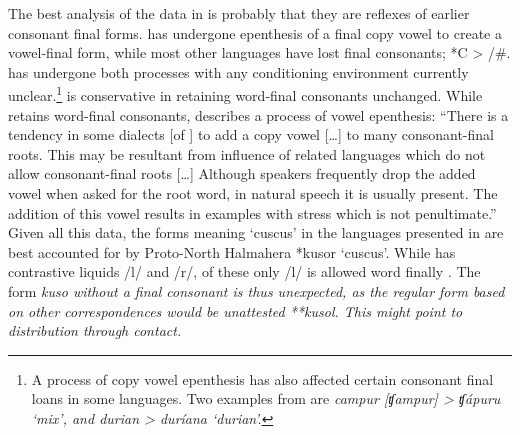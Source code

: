 The best analysis of the data 
in  is probably that they are
reflexes of earlier consonant final forms.
 has undergone epenthesis of a final copy vowel to create
a vowel-final form, while most other languages have lost final consonants; *C > {\0} /{\gap}{\#}.
 has undergone both processes with any conditioning environment currently unclear.\footnote{
		A process of copy vowel epenthesis has also affected certain consonant
		final loans in some  languages.
		Two examples from  are  \it{campur} [ʧampur] >  \it{ʧápuru} ‘mix’,
		and  \it{durian} >  \it{duríana} ‘durian’.}
 is conservative in retaining word-final consonants unchanged.
While 
retains word-final consonants, \citet[78]{Wimbish1992} describes a process of vowel epenthesis:
“There is a tendency in some dialects [of ] to add a copy
vowel [{\ldots}] to many consonant-final roots.
This may be resultant from influence of related languages which
do not allow consonant-final roots [{\ldots}] Although speakers
frequently drop the added vowel when asked for the root word,
in natural speech it is usually present.
The addition of this vowel results in examples with stress which
is not penultimate.” 
Given all this data,
the forms meaning ‘cuscus’ in the  languages
presented in  are best accounted for by Proto-North Halmahera *kusor ‘cuscus’.
While  has contrastive liquids /l/
and /r/, of these only /l/ is allowed word finally \citep[78]{Wimbish1992}.
The  form \it{kuso} without a final consonant is thus unexpected,
as the regular form based on other correspondences would be unattested **kusol.
This might point to distribution through contact.
